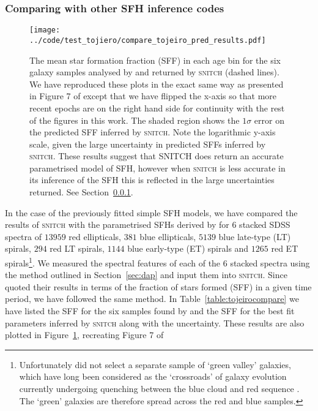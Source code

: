 \documentclass[useAMS,usenatbib]{mn2e}
\begin{document}
\subsubsection{Comparing with other SFH inference codes}\label{secsec:compare}

\begin{figure}
\centering
\texttt{[image: ../code/test\_tojiero/compare\_tojeiro\_pred\_results.pdf]}
\caption{The mean star formation fraction (SFF) in each age bin for the six galaxy samples analysed by \protect\cite[][solid lines]{tojeiro13} and returned by \textsc{snitch} (dashed lines). We have reproduced these plots in the exact same way as presented in Figure 7 of \citeauthor{tojeiro13} except that we have flipped the x-axis so that more recent epochs are on the right hand side for continuity with the rest of the figures in this work. The shaded region shows the $1\sigma$ error on the predicted SFF inferred by \textsc{snitch}. Note the logarithmic y-axis scale, given the large uncertainty in predicted SFFs inferred by \textsc{snitch}. These results suggest that \textsc{SNITCH} does return an accurate parametrised model of SFH, however when \textsc{snitch} is less accurate in its inference of the SFH this is reflected in the large uncertainties returned. See Section~\ref{secsec:compare}. }
\label{fig:tojeirocompare}
\end{figure}

In the case of the previously fitted simple SFH models, we have compared the results of \textsc{snitch} with the parametrised SFHs derived by \cite{tojeiro13} for $6$ stacked SDSS spectra of $13959$ red ellipticals, $381$ blue ellipticals, $5139$ blue late-type (LT) spirals, $294$ red LT spirals, $1144$ blue early-type (ET) spirals and $1265$ red ET spirals\footnote{Unfortunately \citeauthor{tojeiro13} did not select a separate sample of `green valley' galaxies, which have long been considered as the `crossroads' of galaxy evolution currently undergoing quenching between the blue cloud and red sequence \citep{smethurst15}. The `green' galaxies are therefore spread across the \protect\citeauthor{tojeiro13} red and blue samples. }. We measured the spectral features of each of the $6$ stacked spectra using the method outlined in Section~\ref{sec:dap} and input them into \textsc{snitch}. Since \citeauthor{tojeiro13} quoted their results in terms of the fraction of stars formed (SFF) in a given time period, we have followed the same method. In Table~\ref{table:tojeirocompare} we have listed the SFF for the six samples found by \citeauthor{tojeiro13} and the SFF for the best fit parameters inferred by \textsc{snitch} along with the uncertainty. These results are also plotted in Figure~\ref{fig:tojeirocompare}, recreating Figure 7 of \citeauthor{tojeiro13}
\end{document}
